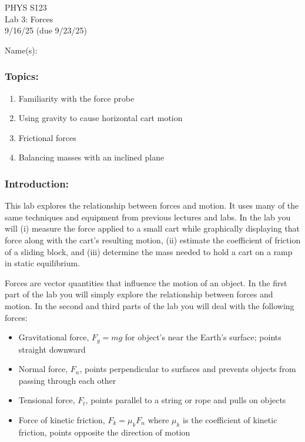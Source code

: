 \documentclass[11pt,letterpaper]{article}
\begin{document}
\setlength{\parindent}{0in}
\setlength{\itemsep}{0in}

\begin{flushright}
PHYS S123\\
Lab 3: Forces\\
9/16/25 (due 9/23/25)
\end{flushright}

Name(s):\\

\subsubsection*{Topics:}
\begin{enumerate}
\setlength{\parskip}{3pt}
\item Familiarity with the force probe
\item Using gravity to cause horizontal cart motion
\item Frictional forces
\item Balancing masses with an inclined plane
\end{enumerate}

\subsubsection*{Introduction:}
This lab explores the relationship between forces and motion. It uses many of the same techniques and equipment from previous lectures and labs. In the lab you will (i) measure the force applied to a small cart while graphically displaying that force along with the cart's resulting motion, (ii) estimate the coefficient of friction of a sliding block, and (iii) determine the mass needed to hold a cart on a ramp in static equilibrium.

Forces are vector quantities that influence the motion of an object. In the first part of the lab you will simply explore the relationship between forces and motion. In the second and third parts of the lab you will deal with the following forces:
\begin{itemize}
\setlength{\parskip}{3pt}
\item Gravitational force, $F_g = mg$ for object's near the Earth's surface; points straight downward
\item Normal force, $F_n$, points perpendicular to surfaces and prevents objects from passing through each other
\item Tensional force, $F_t$, points parallel to a string or rope and pulls on objects
\item Force of kinetic friction, $F_k=\mu_kF_n$ where $\mu_k$ is the coefficient of kinetic friction, points opposite the direction of motion
\end{itemize}
\end{document}
